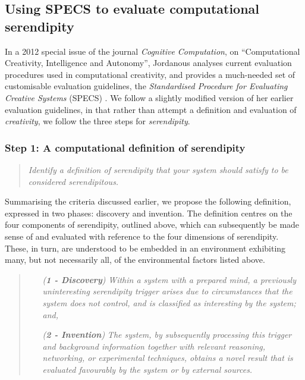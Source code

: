 \subsection{Using SPECS to evaluate computational serendipity}\label{specs-overview}

In a 2012 special issue of the journal {\em Cognitive Computation}, on
``Computational Creativity, Intelligence and Autonomy'', Jordanous
analyses current evaluation procedures used in computational
creativity, and provides a much-needed set of customisable evaluation
guidelines, the \emph{Standardised Procedure for Evaluating Creative
  Systems} (SPECS) \cite{jordanous:12}.
%
We follow a slightly modified version of her earlier evaluation
guidelines, in that rather than attempt a definition and evaluation of
{\em creativity}, we follow the three steps for \emph{serendipity}.

\subsubsection*{Step 1: A computational definition of serendipity}
\begin{quote} {\em Identify a definition of serendipity that your
    system should satisfy to be considered serendipitous.}\end{quote}

Summarising the criteria discussed earlier, we propose the following
definition, expressed in two phases: discovery and invention.  The
definition centres on the four components of serendipity, outlined
above, which can subsequently be made sense of and evaluated with
reference to the four dimensions of serendipity.  These, in turn, are
understood to be embedded in an environment exhibiting many, but not
necessarily all, of the environmental factors listed above.

\begin{quote}
\begin{enumerate}[itemsep=2pt,labelwidth=9em,leftmargin=6em,rightmargin=2em]
\item[\emph{(\textbf{1 - Discovery})}] \emph{Within a system with a prepared mind, a previously uninteresting serendipity trigger arises due to circumstances that the system does not control, and is classified as interesting by the system; and,}
\item[\emph{(\textbf{2 - Invention})}] \emph{The system, by subsequently processing this trigger and background information together with relevant reasoning, networking, or experimental techniques, obtains a novel result that is evaluated favourably by the system or by external sources.}
\end{enumerate}
\end{quote}

